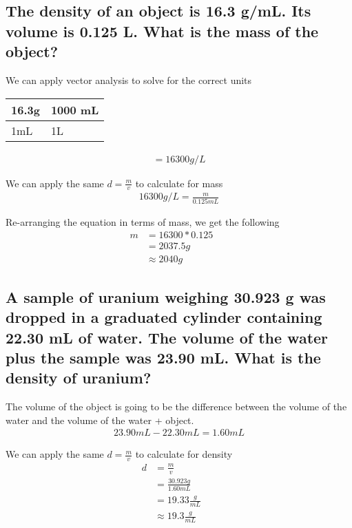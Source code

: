 \documentclass[11pt]{article}
\begin{document}
\subsection{The density of an object is 16.3 g/mL. Its volume is 0.125 L. What is the mass of the object?}
\label{sec:org2e6f4db}
We can apply vector analysis to solve for the correct units

\begin{center}
\begin{tabular}{ll}
16.3g & 1000 mL\\
\hline
1mL & 1L\\
\end{tabular}
\end{center}
\begin{align*}
=16300{g}/{L}
\end{align*}

We can apply the same \(d=\frac{m}{v}\) to calculate for mass
\begin{align*}
16300{g}/{L}=\frac{m}{0.125mL}
\end{align*}

Re-arranging the equation in terms of mass, we get the following
\begin{align}
m &= 16300 * 0.125&&\\\nonumber
            &= 2037.5g&&\\\nonumber
            &\approx 2040g&&
\end{align}

\subsection{A sample of uranium weighing 30.923 g was dropped in a graduated cylinder containing 22.30 mL of water. The volume of the water plus the sample was 23.90 mL. What is the density of uranium?}
\label{sec:org31552e2}

The volume of the object is going to be the difference between the volume of the water and the volume of the water + object.
\begin{align*}
23.90mL - 22.30mL = 1.60mL
\end{align*}

We can apply the same \(d=\frac{m}{v}\) to calculate for density
\begin{align}
d&=\frac{m}{v} &&\\\nonumber
            &=\frac{30.923g}{1.60mL}&&\\\nonumber
            &=19.33\frac{g}{mL}&&\\\nonumber
            &\approx19.3\frac{g}{mL}&&
\end{align}
\end{document}
